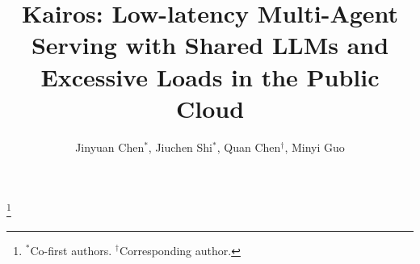 \documentclass[sigplan,nonacm]{acmart}
\newcommand{\system}{Kairos}
\begin{document}


\title{\system{}: Low-latency Multi-Agent Serving with Shared LLMs and Excessive Loads in the Public Cloud}







\author{Jinyuan Chen$^{*}$, Jiuchen Shi$^{*}$, Quan Chen$^\dagger$, Minyi Guo}

\thanks{$^*$Co-first authors. \quad $^\dagger$Corresponding author.}
\renewcommand{\shortauthors}{J. Chen et al.}

\end{document}
